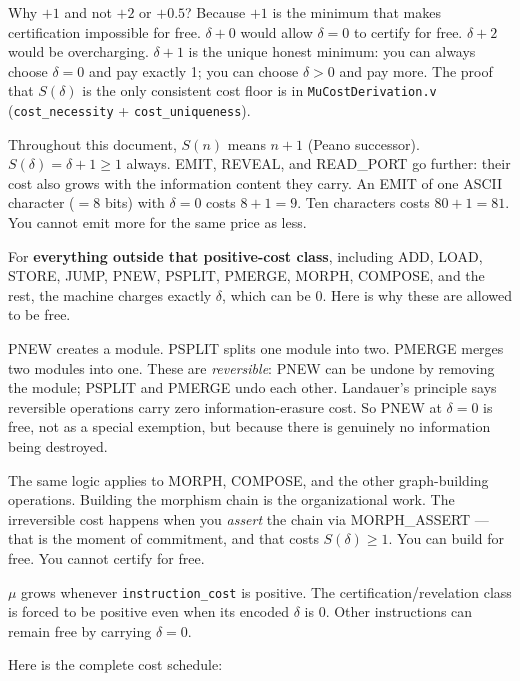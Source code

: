 \documentclass[11pt,a4paper]{article}
\theoremstyle{plain}
\theoremstyle{definition}
\theoremstyle{remark}
\begin{document}
Why $+1$ and not $+2$ or $+0.5$? Because $+1$ is the minimum that makes certification impossible for free. $\delta + 0$ would allow $\delta = 0$ to certify for free. $\delta + 2$ would be overcharging. $\delta + 1$ is the unique honest minimum: you can always choose $\delta = 0$ and pay exactly 1; you can choose $\delta > 0$ and pay more. The proof that $S(\delta)$ is the only consistent cost floor is in \texttt{MuCostDerivation.v} (\texttt{cost\_necessity} + \texttt{cost\_uniqueness}).

Throughout this document, $S(n)$ means $n + 1$ (Peano successor). $S(\delta) = \delta + 1 \geq 1$ always. EMIT, REVEAL, and READ\_PORT go further: their cost also grows with the information content they carry. An EMIT of one ASCII character ($= 8$ bits) with $\delta = 0$ costs $8 + 1 = 9$. Ten characters costs $80 + 1 = 81$. You cannot emit more for the same price as less.

For \textbf{everything outside that positive-cost class}, including ADD, LOAD, STORE, JUMP, PNEW, PSPLIT, PMERGE, MORPH, COMPOSE, and the rest, the machine charges exactly $\delta$, which can be 0. Here is why these are allowed to be free.

PNEW creates a module. PSPLIT splits one module into two. PMERGE merges two modules into one. These are \emph{reversible}: PNEW can be undone by removing the module; PSPLIT and PMERGE undo each other. Landauer's principle says reversible operations carry zero information-erasure cost. So PNEW at $\delta = 0$ is free, not as a special exemption, but because there is genuinely no information being destroyed.

The same logic applies to MORPH, COMPOSE, and the other graph-building operations. Building the morphism chain is the organizational work. The irreversible cost happens when you \emph{assert} the chain via MORPH\_ASSERT --- that is the moment of commitment, and that costs $S(\delta) \geq 1$. You can build for free. You cannot certify for free.

$\mu$ grows whenever \texttt{instruction\_cost} is positive. The certification/revelation class is forced to be positive even when its encoded $\delta$ is 0. Other instructions can remain free by carrying $\delta = 0$.

Here is the complete cost schedule:
\end{document}
